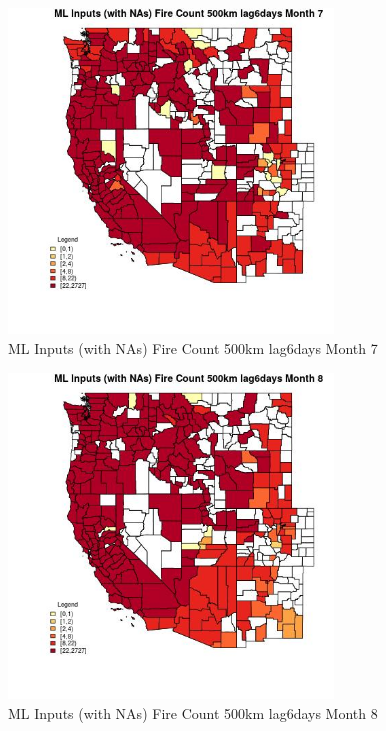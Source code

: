\clearpage 

\begin{figure} 
\centering  
\includegraphics[width=0.77\textwidth]{Code_Outputs/Report_ML_input_PM25_Step4_part_f_de_duplicated_aveswNAs_CountyFire_Count_500km_lag6daysmedianMonth7.jpg} 
\caption{\label{fig:Report_ML_input_PM25_Step4_part_f_de_duplicated_aveswNAsCountyFire_Count_500km_lag6daysmedianMonth7}ML Inputs (with NAs) Fire Count 500km lag6days Month 7} 
\end{figure} 
 

\begin{figure} 
\centering  
\includegraphics[width=0.77\textwidth]{Code_Outputs/Report_ML_input_PM25_Step4_part_f_de_duplicated_aveswNAs_CountyFire_Count_500km_lag6daysmedianMonth8.jpg} 
\caption{\label{fig:Report_ML_input_PM25_Step4_part_f_de_duplicated_aveswNAsCountyFire_Count_500km_lag6daysmedianMonth8}ML Inputs (with NAs) Fire Count 500km lag6days Month 8} 
\end{figure} 
 

